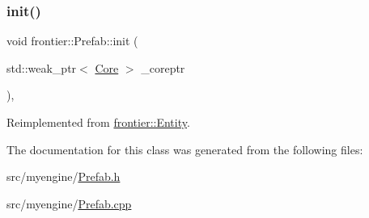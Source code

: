 \mbox{\label{classfrontier_1_1_prefab_a6f41f76c2c8484ba9d4451a936f43e42}} 
\subsubsection{\texorpdfstring{init()}{init()}}
{\footnotesize\ttfamily void frontier\+::\+Prefab\+::init (\begin{DoxyParamCaption}\item[{std\+::weak\+\_\+ptr$<$ \hyperlink{classfrontier_1_1_core}{Core} $>$}]{\+\_\+coreptr }\end{DoxyParamCaption})\hspace{0.3cm}{\ttfamily [override]}, {\ttfamily [virtual]}}



Reimplemented from \hyperlink{classfrontier_1_1_entity_a9a37ec4188e73c190471a5de2db21c77}{frontier\+::\+Entity}.



The documentation for this class was generated from the following files\+:\begin{DoxyCompactItemize}
\item 
src/myengine/\hyperlink{_prefab_8h}{Prefab.\+h}\item 
src/myengine/\hyperlink{_prefab_8cpp}{Prefab.\+cpp}\end{DoxyCompactItemize}
